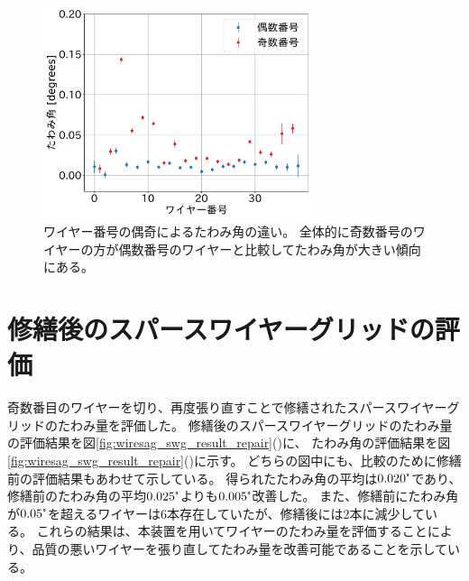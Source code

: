 \documentclass[../../main.tex]{subfiles}
\begin{document}
\begin{figure}[H]
    \centering
    \includegraphics[width=0.7\textwidth]{wiresag_swg/swg_sag_angle_before_even_odd.pdf}
    \caption{ワイヤー番号の偶奇によるたわみ角の違い。
    全体的に奇数番号のワイヤーの方が偶数番号のワイヤーと比較してたわみ角が大きい傾向にある。}
    \label{fig:wiresag_swg_even_odd}
\end{figure}

\section{修繕後のスパースワイヤーグリッドの評価}
奇数番目のワイヤーを切り、再度張り直すことで修繕されたスパースワイヤーグリッドのたわみ量を評価した。
修繕後のスパースワイヤーグリッドのたわみ量の評価結果を図\ref{fig:wiresag_swg_result_repair}()に、
たわみ角の評価結果を図\ref{fig:wiresag_swg_result_repair}()に示す。
どちらの図中にも、比較のために修繕前の評価結果もあわせて示している。
得られたたわみ角の平均は$0.020\tcdegree$であり、修繕前のたわみ角の平均$0.025\tcdegree$よりも$0.005\tcdegree$改善した。
また、修繕前にたわみ角が$0.05\tcdegree$を超えるワイヤーは6本存在していたが、修繕後には2本に減少している。
これらの結果は、本装置を用いてワイヤーのたわみ量を評価することにより、品質の悪いワイヤーを張り直してたわみ量を改善可能であることを示している。


\end{document}
